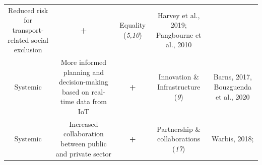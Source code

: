 \documentclass[
]{book}
\begin{document}
\begin{longtable}[]{@{}ccccc@{}}
\begin{minipage}[t]{0.16\columnwidth}
Reduced risk for transport-related social exclusion\strut
\end{minipage} & \begin{minipage}[t]{0.17\columnwidth}\centering
\textbf{+}\strut
\end{minipage} & \begin{minipage}[t]{0.17\columnwidth}\centering
Equality (\emph{5,10})\strut
\end{minipage} & \begin{minipage}[t]{0.17\columnwidth}\centering
Harvey et al., 2019; Pangbourne et al., 2010\strut
\end{minipage}\tabularnewline
\begin{minipage}[t]{0.17\columnwidth}\centering
Systemic\strut
\end{minipage} & \begin{minipage}[t]{0.16\columnwidth}\centering
More informed planning and decision-making based on real-time data from IoT\strut
\end{minipage} & \begin{minipage}[t]{0.17\columnwidth}\centering
\textbf{+}\strut
\end{minipage} & \begin{minipage}[t]{0.17\columnwidth}\centering
Innovation \& Infrastructure (\emph{9})\strut
\end{minipage} & \begin{minipage}[t]{0.17\columnwidth}\centering
Barns, 2017, Bouzguenda et al., 2020\strut
\end{minipage}\tabularnewline
\begin{minipage}[t]{0.17\columnwidth}\centering
Systemic\strut
\end{minipage} & \begin{minipage}[t]{0.16\columnwidth}\centering
Increased collaboration between public and private sector\strut
\end{minipage} & \begin{minipage}[t]{0.17\columnwidth}\centering
\textbf{+}\strut
\end{minipage} & \begin{minipage}[t]{0.17\columnwidth}\centering
Partnership \& collaborations (\emph{17})\strut
\end{minipage} & \begin{minipage}[t]{0.17\columnwidth}\centering
Warbis, 2018;\strut
\end{minipage}\tabularnewline
\bottomrule
\end{longtable}
\end{document}
